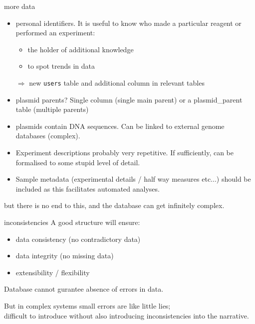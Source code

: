 \documentclass[pdf]{beamer}
\begin{document}
\begin{frame}{more data}

  {\small
  \begin{itemize}
  \item personal identifiers. It is useful to know who made a
    particular reagent or performed an experiment:
    \begin{itemize}
    \item the holder of additional knowledge
    \item to spot trends in data
    \end{itemize}
    $\Rightarrow$ new \texttt{users} table and additional column in relevant tables
  \item plasmid parents? Single column (single main parent) or a plasmid\_parent table
    (multiple parents)
  \item plasmids contain DNA sequences. Can be linked to external genome databases (complex).
  \item Experiment descriptions probably very repetitive. If sufficiently, can be formalised
    to some stupid level of detail.
  \item Sample metadata (experimental details / half way measures etc...) should be included
    as this facilitates automated analyses.
  \end{itemize}
  }
  but there is no end to this, and the database can get infinitely complex.
\end{frame}

\begin{frame}{inconsistencies}
  A good structure will ensure:
  \begin{itemize}
  \item data consistency (no contradictory data)
  \item data integrity (no missing data)
  \item extensibility / flexibility
  \end{itemize}

  Database cannot gurantee absence of errors in data. 

  But in complex systems small errors are like little lies;\\
  difficult to introduce without also introducing inconsistencies 
  into the narrative.
\end{frame}
\end{document}
